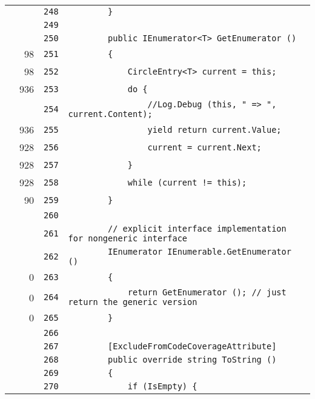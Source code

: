 \documentclass[a4paper,10pt]{article}
\begin{document}
\begin{longtable}[l]{lrrl}
\cellcolor{gray} &  & \verb~248~ & \verb~        }~\\
\cellcolor{gray} &  & \verb~249~ & \verb~~\\
\cellcolor{gray} &  & \verb~250~ & \verb~        public IEnumerator<T> GetEnumerator ()~\\
\cellcolor{green} & 98 & \verb~251~ & \verb~        {~\\
\cellcolor{green} & 98 & \verb~252~ & \verb~            CircleEntry<T> current = this;~\\
\cellcolor{green} & 936 & \verb~253~ & \verb~            do {~\\
\cellcolor{gray} &  & \verb~254~ & \verb~                //Log.Debug (this, " => ", current.Content);~\\
\cellcolor{green} & 936 & \verb~255~ & \verb~                yield return current.Value;~\\
\cellcolor{green} & 928 & \verb~256~ & \verb~                current = current.Next;~\\
\cellcolor{green} & 928 & \verb~257~ & \verb~            }~\\
\cellcolor{green} & 928 & \verb~258~ & \verb~            while (current != this);~\\
\cellcolor{green} & 90 & \verb~259~ & \verb~        }~\\
\cellcolor{gray} &  & \verb~260~ & \verb~~\\
\cellcolor{gray} &  & \verb~261~ & \verb~        // explicit interface implementation for nongeneric interface~\\
\cellcolor{gray} &  & \verb~262~ & \verb~        IEnumerator IEnumerable.GetEnumerator ()~\\
\cellcolor{red} & 0 & \verb~263~ & \verb~        {~\\
\cellcolor{red} & 0 & \verb~264~ & \verb~            return GetEnumerator (); // just return the generic version~\\
\cellcolor{red} & 0 & \verb~265~ & \verb~        }~\\
\cellcolor{gray} &  & \verb~266~ & \verb~~\\
\cellcolor{gray} &  & \verb~267~ & \verb~        [ExcludeFromCodeCoverageAttribute]~\\
\cellcolor{gray} &  & \verb~268~ & \verb~        public override string ToString ()~\\
\cellcolor{gray} &  & \verb~269~ & \verb~        {~\\
\cellcolor{gray} &  & \verb~270~ & \verb~            if (IsEmpty) {~\\

\end{longtable}
\end{document}
